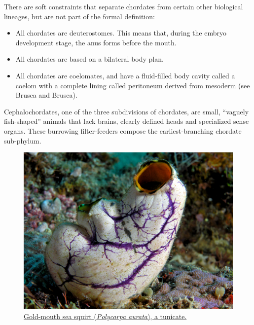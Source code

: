 There are soft constraints that separate chordates from certain other biological lineages, but are not part of the formal definition:

\begin{itemize}
\tightlist
\item
  All chordates are deuterostomes. This means that, during the embryo development stage, the anus forms before the mouth.
\item
  All chordates are based on a bilateral body plan.
\item
  All chordates are coelomates, and have a fluid-filled body cavity called a coelom with a complete lining called peritoneum derived from mesoderm (see Brusca and Brusca).
\end{itemize}

Cephalochordates, one of the three subdivisions of chordates, are small, ``vaguely fish-shaped'' animals that lack brains, clearly defined heads and specialized sense organs. These burrowing filter-feeders compose the earliest-branching chordate sub-phylum.



\begin{figure}

{\centering \includegraphics[width=0.7\linewidth]{./figures/animals/Tunicate_komodo} 

}

\caption{\href{https://commons.wikimedia.org/wiki/File:Tunicate_komodo.jpg}{Gold-mouth sea squirt (\emph{Polycarpa aurata}), a tunicate.}}\label{fig:tunicate}
\end{figure}


